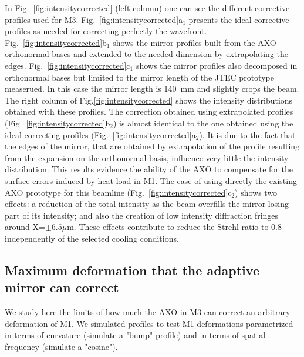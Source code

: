 \documentclass{iucr}              %
\newcommand{\inred}[1]{{\color{red}#1}}
\begin{document}
In Fig.~\ref{fig:intensitycorrected} \inred{(left column)} one can see the different corrective profiles used for M3. 
Fig.~\ref{fig:intensitycorrected}a$_1$ presents the ideal corrective profiles as needed for correcting perfectly the wavefront. Fig.~\ref{fig:intensitycorrected}b$_1$ shows the mirror profiles built from the AXO orthonormal bases and extended to the needed dimension by extrapolating the edges. Fig.~\ref{fig:intensitycorrected}c$_1$ shows the mirror profiles also decomposed in orthonormal bases but limited to the mirror length of the JTEC prototype measerued. In this case the mirror length is 140~mm and slightly crops the beam.
The right column of Fig.\ref{fig:intensitycorrected} shows the intensity distributions obtained with these profiles.
The correction obtained using extrapolated profiles (Fig.~\ref{fig:intensitycorrected}b$_2$) is almost identical to the one obtained using the ideal correcting profiles (Fig.~\ref{fig:intensitycorrected}a$_2$). It is due to the fact that the edges of the mirror, that are obtained by extrapolation of the profile resulting from the expansion on the orthonormal basis, influence very little the intensity distribution. This results evidence the ability of the AXO to compensate for the surface errors induced by heat load in M1. The case of using directly the existing AXO prototype for this beamline (Fig.~\ref{fig:intensitycorrected}c$_2$) shows two effects: a reduction of the total intensity as the beam overfills the mirror losing part of its intensity; and also the creation of low intensity diffraction fringes around X=$\pm6.5\mu$m. These effects contribute to reduce the Strehl ratio to 0.8 independently of the selected cooling conditions.


\subsection{Maximum deformation that the adaptive mirror can correct}

We study here the limits of how much the AXO in M3 can correct an arbitrary deformation of M1. We simulated profiles to test M1 deformations parametrized in terms of curvature (simulate a "bump" profile) and in terms of spatial frequency (simulate a "cosine"). 
\end{document}
